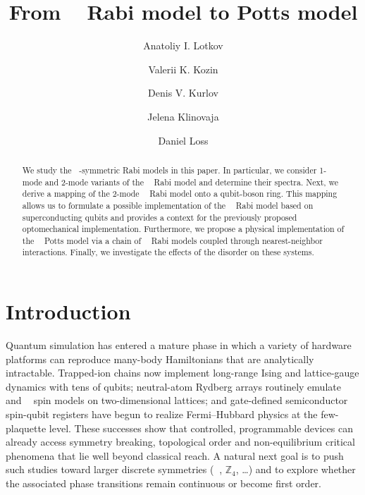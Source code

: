 \documentclass[reprint, aps, prx, amsmath, amssymb, longbibliography, superscriptaddress]{revtex4-2}
\DeclareMathOperator{\Zn}{\mathbb{Z}_n}
\DeclareMathOperator{\Zthree}{\mathbb{Z}_3}
\DeclareMathOperator{\Ztwo}{\mathbb{Z}_2}
\begin{document}
\title{From \texorpdfstring{$\Zthree$}{Z3} Rabi model to Potts model}

\author{Anatoliy I. Lotkov}

\author{Valerii K. Kozin}


\author{Denis V. Kurlov}


\author{Jelena Klinovaja}

\author{Daniel Loss}



\begin{abstract}
We study the $\Zthree$-symmetric Rabi models in this paper. In particular, we consider 1-mode and 2-mode variants of the $\Zthree$ Rabi model and determine their spectra. Next, we derive a mapping of the 2-mode $\Zthree$ Rabi model onto a qubit-boson ring. This mapping allows us to formulate a possible implementation of the $\Zthree$ Rabi model based on superconducting qubits and provides a context for the previously proposed optomechanical implementation. Furthermore, we propose a physical implementation of the $\Zthree$ Potts model via a chain of $\Zthree$ Rabi models coupled through nearest-neighbor interactions. Finally, we investigate the effects of the disorder on these systems.
\end{abstract}

\maketitle


\section{Introduction}

Quantum simulation has entered a mature phase in which a variety of hardware platforms can reproduce many-body Hamiltonians that are analytically intractable. Trapped-ion chains now implement long-range Ising and lattice-gauge dynamics with tens of qubits; neutral-atom Rydberg arrays routinely emulate $\Ztwo $ and $\Zn$ spin models on two-dimensional lattices; and gate-defined semiconductor spin-qubit registers have begun to realize Fermi–Hubbard physics at the few-plaquette level. These successes show that controlled, programmable devices can already access symmetry breaking, topological order and non-equilibrium critical phenomena that lie well beyond classical reach. A natural next goal is to push such studies toward larger discrete symmetries ($\Zthree$, $\mathbb{Z}_4$, …) and to explore whether the associated phase transitions remain continuous or become first order.
\end{document}
